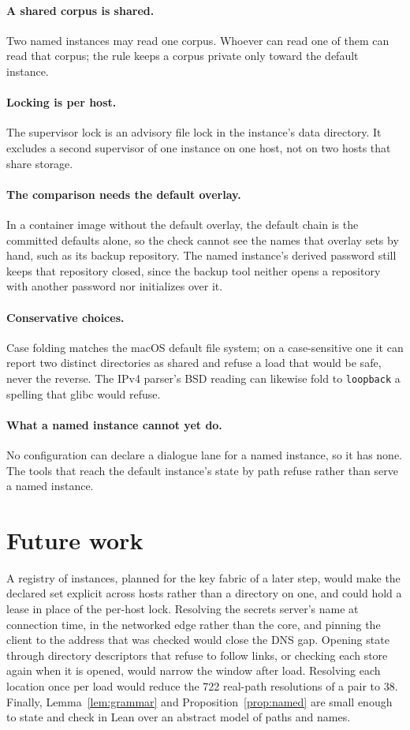 \documentclass[11pt]{article}
\theoremstyle{plain}
\theoremstyle{definition}
\theoremstyle{remark}
\begin{document}
\paragraph{A shared corpus is shared.} Two named instances may read one corpus. Whoever can read
one of them can read that corpus; the rule keeps a corpus private only toward the default
instance.

\paragraph{Locking is per host.} The supervisor lock is an advisory file lock in the instance's data
directory. It excludes a second supervisor of one instance on one host, not on two hosts that share
storage.

\paragraph{The comparison needs the default overlay.} In a container image without the default
overlay, the default chain is the committed defaults alone, so the check cannot see the names that
overlay sets by hand, such as its backup repository. The named instance's derived password still
keeps that repository closed, since the backup tool neither opens a repository with another
password nor initializes over it.

\paragraph{Conservative choices.} Case folding matches the macOS default file system; on a
case-sensitive one it can report two distinct directories as shared and refuse a load that would be
safe, never the reverse. The IPv4 parser's BSD reading can likewise fold to \texttt{loopback} a
spelling that glibc would refuse.

\paragraph{What a named instance cannot yet do.} No configuration can declare a dialogue lane for a
named instance, so it has none. The tools that reach the default instance's state by path refuse
rather than serve a named instance.

\section{Future work}
A registry of instances, planned for the key fabric of a later step, would make the declared set
explicit across hosts rather than a directory on one, and could hold a lease in place of the
per-host lock. Resolving the secrets server's name at connection time, in the networked edge rather
than the core, and pinning the client to the address that was checked would close the DNS gap.
Opening state through directory descriptors that refuse to follow links, or checking each store
again when it is opened, would narrow the window after load. Resolving each location once per load
would reduce the 722 real-path resolutions of a pair to 38. Finally, Lemma~\ref{lem:grammar} and
Proposition~\ref{prop:named} are small enough to state and check in Lean over an abstract model of
paths and
names.
\end{document}
